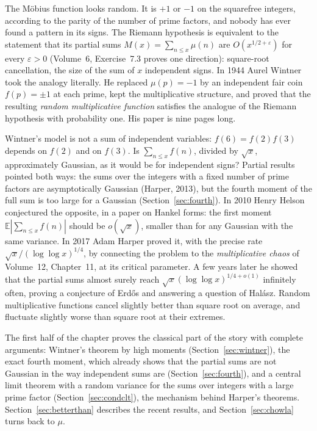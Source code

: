 The Möbius function looks random. It is $+1$ or $-1$ on the squarefree integers, according to the parity of the number of prime factors, and nobody has ever found a pattern in its signs. The Riemann hypothesis is equivalent to the statement that its partial sums $M(x)=\sum_{n\le x}\mu(n)$ are $O(x^{1/2+\varepsilon})$ for every $\varepsilon>0$ (Volume~6, Exercise~7.3 proves one direction): square-root cancellation, the size of the sum of $x$ independent signs. In 1944 Aurel Wintner took the analogy literally. He replaced $\mu(p)=-1$ by an independent fair coin $f(p)=\pm1$ at each prime, kept the multiplicative structure, and proved that the resulting \emph{random multiplicative function} satisfies the analogue of the Riemann hypothesis with probability one. His paper is nine pages long.

Wintner's model is not a sum of independent variables: $f(6)=f(2)f(3)$ depends on $f(2)$ and on $f(3)$. Is $\sum_{n\le x}f(n)$, divided by $\sqrt x$, approximately Gaussian, as it would be for independent signs? Partial results pointed both ways: the sums over the integers with a fixed number of prime factors are asymptotically Gaussian (Harper, 2013), but the fourth moment of the full sum is too large for a Gaussian (Section~\ref{sec:fourth}). In 2010 Henry Helson conjectured the opposite, in a paper on Hankel forms: the first moment $\mathbb E|\sum_{n\le x}f(n)|$ should be $o(\sqrt x)$, smaller than for any Gaussian with the same variance. In 2017 Adam Harper proved it, with the precise rate $\sqrt x/(\log\log x)^{1/4}$, by connecting the problem to the \emph{multiplicative chaos} of Volume~12, Chapter~11, at its critical parameter. A few years later he showed that the partial sums almost surely reach $\sqrt x(\log\log x)^{1/4+o(1)}$ infinitely often, proving a conjecture of Erd\H{o}s and answering a question of Halász. Random multiplicative functions cancel slightly better than square root on average, and fluctuate slightly worse than square root at their extremes.

The first half of the chapter proves the classical part of the story with complete arguments: Wintner's theorem by high moments (Section~\ref{sec:wintner}), the exact fourth moment, which already shows that the partial sums are not Gaussian in the way independent sums are (Section~\ref{sec:fourth}), and a central limit theorem with a random variance for the sums over integers with a large prime factor (Section~\ref{sec:condclt}), the mechanism behind Harper's theorems. Section~\ref{sec:betterthan} describes the recent results, and Section~\ref{sec:chowla} turns back to $\mu$.

